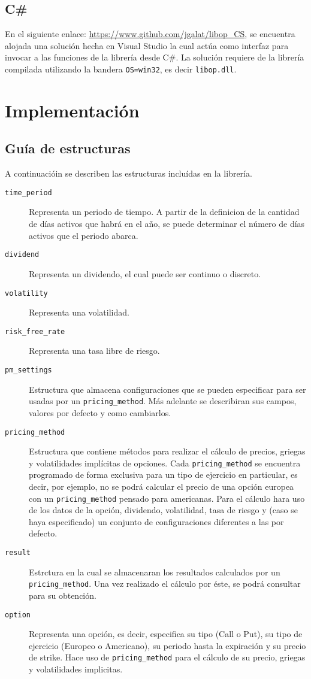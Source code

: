 \documentclass[12pt,a4paper,final]{article}
\begin{document}
	\subsection{C\#}
		En el siguiente enlace: \url{https://www.github.com/jgalat/libop_CS}, se encuentra alojada
		una solución hecha en Visual Studio la cual actúa como interfaz para invocar a las funciones
		de la librería desde C\#. La solución requiere de la librería compilada utilizando la bandera
		\texttt{OS=win32}, es decir \texttt{libop.dll}.
		
\section{Implementación}

	\subsection{Guía de estructuras}
		A continuacióin se describen las estructuras incluídas en la librería.
		
		\begin{description}
			\item [\texttt{time\_period}] Representa un periodo de tiempo. A partir de la definicion de 
				la cantidad de días activos que habrá en el año, se puede determinar el número
				de días activos que el periodo abarca.  
			\item [\texttt{dividend}] Representa un dividendo, el cual puede ser continuo o discreto.
			\item [\texttt{volatility}] Representa una volatilidad.
			\item [\texttt{risk\_free\_rate}] Representa una tasa libre de riesgo.
			\item [\texttt{pm\_settings}] Estructura que almacena configuraciones que se pueden
				especificar para ser usadas por un \texttt{pricing\_method}. Más adelante se describiran
				sus campos, valores por defecto y como cambiarlos.
			\item [\texttt{pricing\_method}] Estructura que contiene métodos para realizar el cálculo
				de precios, griegas y volatilidades implícitas de opciones. Cada \texttt{pricing\_method}
				se encuentra programado de forma exclusiva para un tipo de ejercicio en particular,
				es decir, por ejemplo, no se podrá calcular el precio de una opción europea con un
			\texttt{pricing\_method} pensado para americanas. Para el cálculo hara uso de los datos
				de la opción, dividendo, volatilidad, tasa de riesgo y (caso se haya especificado) un conjunto
				de configuraciones diferentes a las por defecto.
			\item [\texttt{result}]	Estrctura en la cual se almacenaran los resultados calculados por
				un \texttt{pricing\_method}. Una vez realizado el cálculo por éste, se podrá consultar para
				su obtención.
			\item [\texttt{option}] Representa una opción, es decir, especifica su tipo (Call o Put), su
				tipo de ejercicio (Europeo o Americano), su periodo hasta la expiración y su precio de
				strike. Hace uso de \texttt{pricing\_method} para el cálculo de su precio, griegas y
				volatilidades implicitas.
		\end{description}
\end{document}
